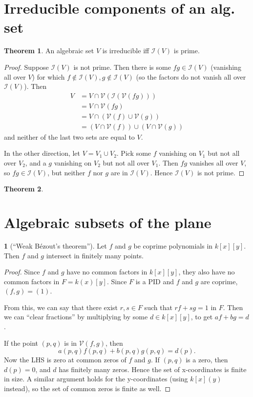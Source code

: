 \documentclass{book}
\newcommand{\I}[1]{\mathcal{I}(#1)}
\newcommand{\V}[1]{\mathcal{V}(#1)}
\theoremstyle{definition}
\newtheorem*{thmsmall}{Theorem}
\theoremstyle{block}
\theoremstyle{thm}
\newtheorem*{thm}{}
\begin{document}
\section{Irreducible components of an alg. set}
\begin{thmsmall}
  An algebraic set $V$ is irreducible iff $\I V$ is
  prime.
\end{thmsmall}
\begin{proof}
  Suppose $\I V$ is not prime. Then there is some $fg\in\I V$ (vanishing all
  over $V$) for which $f\notin\I V,g\notin\I V$ (so the factors do not vanish
  all over $\I V$). Then
  \begin{align*}
    V &= V\cap \V{\I{\V{fg}}}\\ 
      &= V\cap \V{fg}\\
      &= V\cap(\V f\cup\V g)\\
      &= (V\cap\V f)\cup(V\cap\V g)
  \end{align*}
  and neither of the last two sets are equal to $V$.\par
  In the other direction, let $V=V_1\cup V_2$. Pick some $f$ vanishing on $V_1$
  but not all over $V_2$, and a $g$ vanishing on $V_2$ but not all over $V_1$.
  Then $fg$ vanishes all over $V$, so $fg\in\I V$, but neither $f$ nor $g$ are
  in $\I V$. Hence $\I V$ is not prime.
\end{proof}

\begin{thmsmall}
  
\end{thmsmall}

\section{Algebraic subsets of the plane}
\begin{thm}[``Weak B\'ezout's theorem'']
  Let $f$ and $g$ be coprime polynomials in $k[x][y]$. Then $f$ and $g$ intersect
  in finitely many points.
\end{thm}
\begin{proof}
  Since $f$ and $g$ have no common factors in $k[x][y]$, they also have no
  common factors in $F=k(x)[y]$. Since $F$ is a PID and $f$ and $g$ are coprime,
  $(f,g)=(1)$.\par
  From this, we can say that there exist $r,s\in F$ such that $rf+sg=1$ in $F$.
  Then we can ``clear fractions'' by multiplying by some $d\in k[x][y]$, to get
  $af+bg=d$.\par
  If the point $(p,q)$ is in $\V{f,g}$, then 
  \[a(p,q)f(p,q)+b(p,q)g(p,q)=d(p).\]
  Now the LHS is zero at common zeros of $f$ and $g$. If $(p,q)$ is a zero, then
  $d(p)=0$, and $d$ has finitely many zeros. Hence the set of x-coordinates is
  finite in size. A similar argument holds for the y-coordinates (using
  $k[x](y)$ instead), so the set of common zeros is finite as well.
\end{proof}
\end{document}

